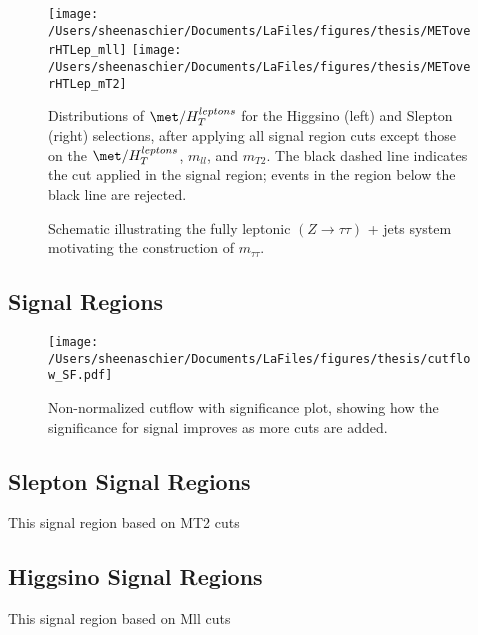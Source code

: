  \begin{figure}[tbp]
  \centering
  \texttt{[image: /Users/sheenaschier/Documents/LaFiles/figures/thesis/METoverHTLep\_mll]}
  \texttt{[image: /Users/sheenaschier/Documents/LaFiles/figures/thesis/METoverHTLep\_mT2]}
 \caption{Distributions of $\met/H_{T}^{leptons}$ for the Higgsino (left) and Slepton (right) selections, after applying all signal region cuts except those on the $\met/H_{T}^{leptons}$, $m_{ll}$, and $m_{T2}$.  The black dashed line indicates the cut applied in the signal region; events in the region below the black line are rejected.}
 \label{fig:METoverHTLep2D}
 \end{figure}
 
 
  \begin{figure}
  \centering
  
  \caption{Schematic illustrating the fully leptonic $(Z\to\tau\tau)$ + jets system motivating the construction of $m_{\tau\tau}$. }
  \label{fig:ditau_schematic}
  \end{figure}
  \subsection{Signal Regions}
 \begin{figure}[h!]
 \centering
 \texttt{[image: /Users/sheenaschier/Documents/LaFiles/figures/thesis/cutflow\_SF.pdf]}
 \caption{Non-normalized cutflow with significance plot, showing how the significance for signal improves as more cuts are added.}
 \label{fig:cutflow_zn}
 \end{figure}
\subsection{Slepton Signal Regions}
This signal region based on MT2 cuts
\subsection{Higgsino Signal Regions}
This signal region based on Mll cuts

